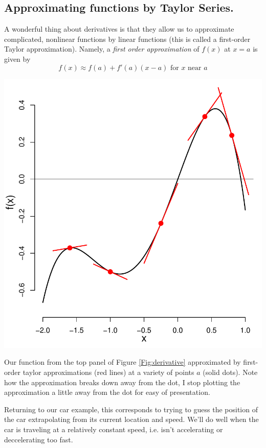 \subsection{Approximating functions by Taylor Series.} \label{Appendix:taylor_series}
A wonderful thing about derivatives is that they allow us to approximate
complicated, nonlinear functions by linear functions (this is called a first-order
  Taylor approximation). Namely, a
\emph{first order approximation} of $f(x)$ at $x=a$ is given by 
\begin{equation}
  f(x) \approx f(a)+f'(a)(x-a) \mbox{ for $x$ near $a$}
  \end{equation}
 \begin{marginfigure}
 \begin{center}
   \includegraphics[width=\textwidth]{math_background/calc_pics/Taylor_1.pdf}\end{center}
 \caption{Our function from the top panel of Figure
   \ref{Fig:derivative} approximated by first-order taylor
   approximations (red lines) at a variety of points $a$ (solid
   dots). Note how the approximation breaks down away from the dot, I
   stop plotting the approximation a little away from the dot for easy
   of presentation. }\label{FigTaylor_1}
\end{marginfigure}
Returning to our car example, this corresponds to trying to guess the
position of the car
extrapolating from its current location and speed. We'll do well when
the car is traveling at a relatively constant speed, i.e. isn't
accelerating or deccelerating too fast. 

